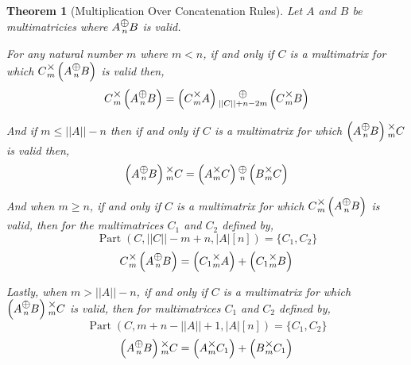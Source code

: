 \documentclass[12pt]{book}
\theoremstyle{plain}
\newtheorem{theorem}{Theorem}[chapter]
\theoremstyle{definition}
\theoremstyle{ppart}
\theoremstyle{case}
\theoremstyle{solution}
\DeclareMathOperator{\Part}{Part}
\newcommand{\mmult}[1]{\text{\raisebox{1ex}{$\underset{#1}{\times}$}}}
\newcommand{\mconcat}[1]{\text{\raisebox{1ex}{$\underset{#1}{\oplus}$}}}
\newcommand{\shape}[1]{\left|#1\right|}
\begin{document}
\begin{theorem}[Multiplication Over Concatenation Rules]
Let $A$ and $B$ be multimatricies where $A \mconcat{n} B$ is valid. 

For any natural number $m$ where $m < n$,
if and only if $C$ is a multimatrix for which $C \mmult{m} \left(A \mconcat{n} B\right)$ is valid then,
\[ C \mmult{m} \left(A \mconcat{n} B\right) = \left(C \mmult{m} A\right) \mconcat{\shape{\shape{C}}+n-2m} \left(C \mmult{m} B\right) \]

And if $m \le \shape{\shape{A}}-n$
then if and only if  $C$ is a multimatrix for which $\left(A \mconcat{n} B\right) \mmult{m} C$ is valid then,
\[ \left(A \mconcat{n} B\right) \mmult{m} C = \left(A \mmult{m} C\right) \mconcat{n} \left(B \mmult{m} C\right) \]

And when $m \ge n$, if and only if $C$ is a multimatrix for which $C \mmult{m} \left(A \mconcat{n} B\right)$ is valid,
then for the multimatrices $C_1$ and $C_2$ defined by,
\[ \Part(C, \shape{\shape{C}}-m+n, \shape{A}[n]) = \{C_1, C_2\} \]
\[
  C \mmult{m} \left(A \mconcat{n} B\right)
  =
  \left( C_1 \mmult{m} A \right) + 
  \left( C_1 \mmult{m} B \right)
\]

Lastly, when $m > \shape{\shape{A}}-n$, if and only if $C$ is a multimatrix for which $\left(A \mconcat{n} B\right) \mmult{m} C$ is valid,
then for multimatrices $C_1$ and $C_2$ defined by,
\[ \Part(C, m+n-\shape{\shape{A}}+1, \shape{A}[n]) = \{C_1, C_2\} \]
\[
  \left(A \mconcat{n} B\right) \mmult{m} C
  =
  \left( A \mmult{m} C_1 \right) + 
  \left( B \mmult{m} C_1 \right)
\]
\end{theorem}
\end{document}
